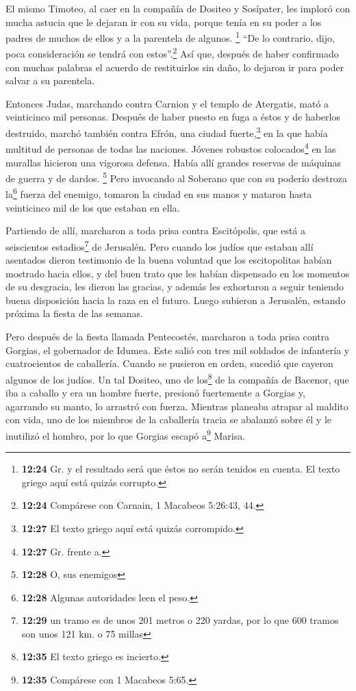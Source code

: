  El mismo Timoteo, al caer en la compañía de Dositeo y
Sosípater, les imploró con mucha astucia que le dejaran ir con su vida,
porque tenía en su poder a los padres de muchos de ellos y a la
parentela de algunos. \footnote{\textbf{12:24} Gr. y el resultado será
  que éstos no serán tenidos en cuenta. El texto griego aquí está quizás
  corrupto.} ``De lo contrario, dijo, poca consideración se tendrá con
estos''.\footnote{\textbf{12:24} Compárese con Carnain, 1 Macabeos
  5:26:43, 44.}  Así que, después de haber confirmado con
muchas palabras el acuerdo de restituirlos sin daño, lo dejaron ir para
poder salvar a su parentela.

 Entonces Judas, marchando contra Carnion y el templo de
Atergatis, mató a veinticinco mil personas.  Después de
haber puesto en fuga a éstos y de haberlos destruido, marchó también
contra Efrón, una ciudad fuerte,\footnote{\textbf{12:27} El texto griego
  aquí está quizás corrompido.} en la que había multitud de personas de
todas las naciones. Jóvenes robustos colocados\footnote{\textbf{12:27}
  Gr. frente a.} en las murallas hicieron una vigorosa defensa. Había
allí grandes reservas de máquinas de guerra y de dardos. 
\footnote{\textbf{12:28} O, sus enemigos} Pero invocando al Soberano que
con su poderío destroza la\footnote{\textbf{12:28} Algunas autoridades
  leen el peso.} fuerza del enemigo, tomaron la ciudad en sus manos y
mataron hasta veinticinco mil de los que estaban en ella.

 Partiendo de allí, marcharon a toda prisa contra
Escitópolis, que está a seiscientos estadios\footnote{\textbf{12:29} un
  tramo es de unos 201 metros o 220 yardas, por lo que 600 tramos son
  unos 121 km. o 75 millas} de Jerusalén.  Pero cuando
los judíos que estaban allí asentados dieron testimonio de la buena
voluntad que los escitopolitas habían mostrado hacia ellos, y del buen
trato que les habían dispensado en los momentos de su desgracia,
 les dieron las gracias, y además les exhortaron a seguir
teniendo buena disposición hacia la raza en el futuro. Luego subieron a
Jerusalén, estando próxima la fiesta de las semanas.

 Pero después de la fiesta llamada Pentecostés, marcharon
a toda prisa contra Gorgias, el gobernador de Idumea. 
Este salió con tres mil soldados de infantería y cuatrocientos de
caballería.  Cuando se pusieron en orden, sucedió que
cayeron algunos de los judíos.  Un tal Dositeo, uno de
los\footnote{\textbf{12:35} El texto griego es incierto.} de la compañía
de Bacenor, que iba a caballo y era un hombre fuerte, presionó
fuertemente a Gorgias y, agarrando su manto, lo arrastró con fuerza.
Mientras planeaba atrapar al maldito con vida, uno de los miembros de la
caballería tracia se abalanzó sobre él y le inutilizó el hombro, por lo
que Gorgias escapó a\footnote{\textbf{12:35} Compárese con 1 Macabeos
  5:65.} Marisa.

